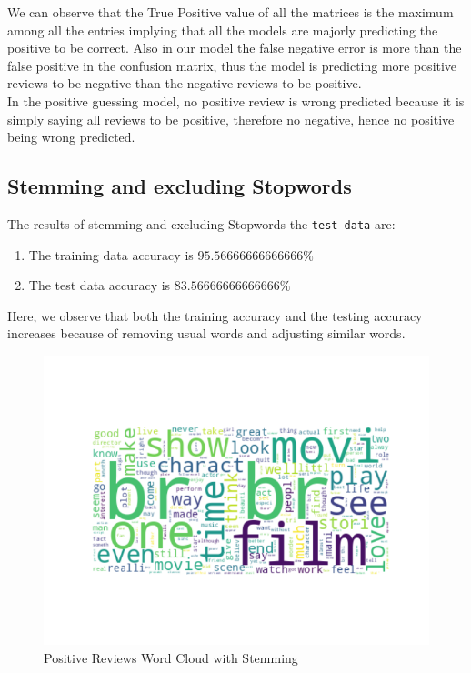 \documentclass[11pt]{article}
\begin{document}
We can observe that the True Positive value of all the matrices is the maximum among all the entries implying that all the models are majorly predicting the positive to be correct. Also in our model the false negative error is more than the false positive in the confusion matrix, thus the model is predicting more positive reviews to be negative than the negative reviews to be positive.
\\

In the positive guessing model, no positive review is wrong predicted because it is simply saying all reviews to be positive, therefore no negative, hence no positive being wrong predicted.

\subsection{Stemming and excluding Stopwords}
The results of stemming and excluding Stopwords the \texttt{test data} are:
\begin{enumerate}
  \item The training data accuracy is $95.56666666666666\%$
  \item The test data accuracy is $83.56666666666666\%$
\end{enumerate}
Here, we observe that both the training accuracy  and the testing accuracy increases because of removing usual words and adjusting similar words.

\begin{figure}[H]
  \includegraphics[width=\linewidth]{StemmedPositiveWordCloud.png}
  \caption{Positive Reviews Word Cloud with Stemming}
  \label{fig1A}
\end{figure}
\end{document}
